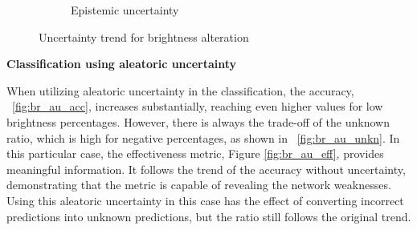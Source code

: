 \begin{figure}[h]
\begin{subfigure}{.5\textwidth}
		\caption{Epistemic uncertainty}
		\label{fig:br_epistemic}
	\end{subfigure}
	\caption{Uncertainty trend for brightness alteration}
	\label{fig:br_uncertainty}
\end{figure}

\vspace{0.3cm}
\textbf{Classification using aleatoric uncertainty}
\vspace{0.1cm}

When utilizing aleatoric uncertainty in the classification, the accuracy, \Fig~\ref{fig:br_au_acc}, increases substantially, reaching even higher values for low brightness percentages. However, there is always the trade-off of the unknown ratio, which is high for negative percentages, as shown in \Fig~\ref{fig:br_au_unkn}. In this particular case, the effectiveness metric, Figure \ref{fig:br_au_eff}, provides meaningful information. It follows the trend of the accuracy without uncertainty, demonstrating that the metric is capable of revealing the network weaknesses. Using this aleatoric uncertainty in this case has the effect of converting incorrect predictions into unknown predictions, but the ratio still follows the original trend.

